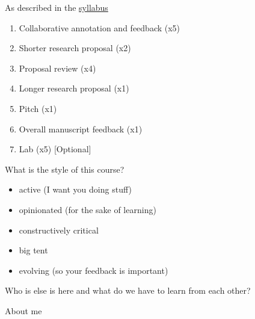 \documentclass{beamer}
\begin{document}
\begin{frame}

As described in the \textcolor{blue}{\href{http://www.princeton.edu/~mjs3/soc596_f2016/}{syllabus}}

\begin{enumerate}
\item Collaborative annotation and feedback (x5)
\pause
\item Shorter research proposal (x2)
\pause 
\item Proposal review (x4)
\pause
\item Longer research proposal (x1)
\pause
\item Pitch (x1)
\pause
\item Overall manuscript feedback (x1)
\pause
\item Lab (x5) [Optional]
\end{enumerate}

\end{frame}
\begin{frame}

\begin{center}
\LARGE{What is the style of this course?}
\end{center}

\end{frame}
\begin{frame}

\begin{itemize}
\item active (I want you doing stuff)
\pause
\item opinionated (for the sake of learning)
\pause
\item constructively critical
\pause
\item big tent
\pause
\item evolving (so your feedback is important)
\end{itemize}

\end{frame}
\begin{frame}

\begin{center}
\LARGE{Who is else is here and what do we have to learn from each other?}
\end{center}

\end{frame}
\begin{frame}

About me

\end{frame}
\end{document}
